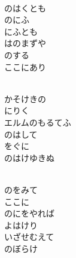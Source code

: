 \documentclass[10pt,b5j]{tarticle} %
\begin{document}
\begin{enumerate}
\begin{minipage}[c]{\blocksize}
    \end{minipage}
    \begin{minipage}[c]{\blocksize}
        
        \vspace{\linespace}
        \item~\\
        のはくとも\\
        のにふ\\
        にふとも\\
        はのまずや\\
        のする\\
        ここにあり
        
    \end{minipage}
    \begin{minipage}[c]{\blocksize}
        
        \vspace{\linespace}
        \item~\\
        かそけきの\\
        にりく\\
        エルムのもるてふ\\
        のはして\\
        をぐに\\
        のはけゆきぬ
        
    \end{minipage}
    \begin{minipage}[c]{\blocksize}
        
        \vspace{\linespace}
        \item~\\
        のをみて\\
        ここに\\
        のにをやれば\\
        よはけり\\
        いざせむえて\\
        のぼらけ
    
    \end{minipage}
\end{enumerate} %
\end{document}
